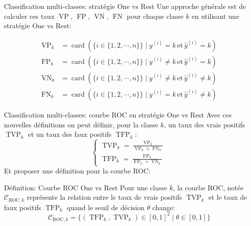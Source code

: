 \begin{frame}{Classification multi-classes: stratégie One vs Rest}
	Une approche générale est de calculer ces taux $\operatorname{VP}$, $\operatorname{FP}$, $\operatorname{VN}$, $\operatorname{FN}$ pour chaque classe $k$ en utilisant une stratégie One vs Rest:
	
	\begin{equation*}
		\begin{aligned}
			\operatorname{VP}_k &= \operatorname{card} \left( \{i \in \{1, 2, \cdots, n\}\} \mid y^{(i)} = k \, \text{et} \, \hat{y}^{(i)} = k \right) \\
			\operatorname{FP}_k &= \operatorname{card} \left( \{i \in \{1, 2, \cdots, n\}\} \mid y^{(i)} \ne k \, \text{et} \, \hat{y}^{(i)} = k \right) \\
			\operatorname{VN}_k &= \operatorname{card} \left( \{i \in \{1, 2, \cdots, n\}\} \mid y^{(i)} \ne k \, \text{et} \, \hat{y}^{(i)} \ne k \right) \\
			\operatorname{FN}_k &= \operatorname{card} \left( \{i \in \{1, 2, \cdots, n\}\} \mid y^{(i)} = k \, \text{et} \, \hat{y}^{(i)} \ne k \right)
		\end{aligned}
	\end{equation*}
	
\end{frame}

\begin{frame}{Classification multi-classes: courbe ROC en stratégie One vs Rest}
	Avec ces nouvelles définitions on peut définir, pour la classe $k$, un taux des vrais positifs $\operatorname{TVP}_k$ et un taux des faux positifs $\operatorname{TFP}_k$:
	\begin{equation*}
		\begin{cases}
			\operatorname{TVP}_k = \displaystyle \frac{\operatorname{VP}_k}{\operatorname{VP}_k + \operatorname{FN}_k} \\[10pt]
			\operatorname{TFP}_k = \displaystyle \frac{\operatorname{FP}_k}{\operatorname{FP}_k + \operatorname{VN}_k}
		\end{cases}
		\nonumber
	\end{equation*}
	\pause
	Et proposer une définition pour la courbe ROC:
	\begin{block}{Définition: Courbe ROC One vs Rest}
		Pour une classe $k$, la courbe ROC, notée $\mathcal{C}_{\text{ROC},k}$ représente la relation entre le taux de vrais positifs $\operatorname{TVP}_k$ et le taux de faux positifs $\operatorname{TFP}_k$ quand le seuil de décision $\theta$ change:
		\begin{equation*}
			\mathcal{C}_{\text{ROC},k} = \{ \left(\operatorname{TFP}_k, \operatorname{TVP}_k\right) \in [0, 1]^2 \mid \theta \in [0, 1]\}
		\end{equation*}
	\end{block}
\end{frame}

